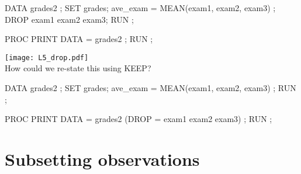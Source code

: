 \begin{frame}[fragile]
\footnotesize
\begin{code}{.0}
DATA grades2 ;
   SET grades;
   ave_exam =  MEAN(exam1, exam2, exam3) ;
   DROP exam1 exam2 exam3;
RUN ;

PROC PRINT DATA = grades2 ;
RUN ;
\end{code}
\emp
{} \hspace{0.1in} \emp
{}
\texttt{[image: L5\_drop.pdf]}
\emp\\
\vskip15pt
\oyo How could we re-state this using KEEP?
\end{frame}

\begin{frame}[fragile]
\footnotesize
\begin{code}{.0}
DATA grades2 ;
   SET grades;
   ave_exam =  MEAN(exam1, exam2, exam3) ;
RUN ;

PROC PRINT DATA = grades2 (DROP = exam1 exam2 exam3) ;
RUN ;
\end{code}
\emp
\end{frame}


\section[Subsetting observations]{Subsetting observations}
\subsection{}
\begin{frame}
\end{frame}

